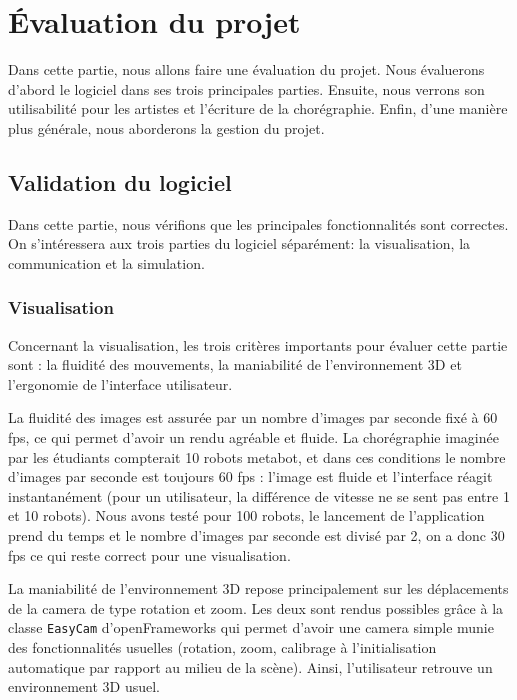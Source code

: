 \section{Évaluation du projet}

Dans cette partie, nous allons faire une évaluation du projet. Nous évaluerons d'abord le logiciel dans ses trois principales parties. Ensuite, nous verrons son utilisabilité pour les artistes et l'écriture de la chorégraphie. Enfin, d'une manière plus générale, nous aborderons la gestion du projet. 

\subsection{Validation du logiciel} %

Dans cette partie, nous vérifions que les principales fonctionnalités sont correctes. On s'intéressera aux trois parties du logiciel séparément: la visualisation, la communication et la simulation. 

\subsubsection{Visualisation}

Concernant la visualisation, les trois critères importants pour évaluer cette partie sont : la fluidité des mouvements, la maniabilité de l'environnement 3D et l'ergonomie de l'interface utilisateur. 

La fluidité des images est assurée par un nombre d'images par seconde fixé à 60 fps, ce qui permet d'avoir un rendu agréable et fluide. La chorégraphie imaginée par les étudiants compterait 10 robots metabot, et dans ces conditions le nombre d'images par seconde est toujours 60 fps : l'image est fluide et l'interface réagit instantanément (pour un utilisateur, la différence de vitesse ne se sent pas entre 1 et 10 robots).
Nous avons testé pour 100 robots, le lancement de l'application prend du temps et le nombre d'images par seconde est divisé par 2, on a donc 30 fps ce qui reste correct pour une visualisation. 

La maniabilité de l'environnement 3D repose principalement sur les déplacements de la camera de type rotation et zoom. Les deux sont rendus possibles grâce à la classe \verb|EasyCam| d'openFrameworks qui permet d'avoir une camera simple munie des fonctionnalités usuelles (rotation, zoom, calibrage à l'initialisation automatique par rapport au milieu de la scène). Ainsi, l'utilisateur retrouve un environnement 3D usuel.

